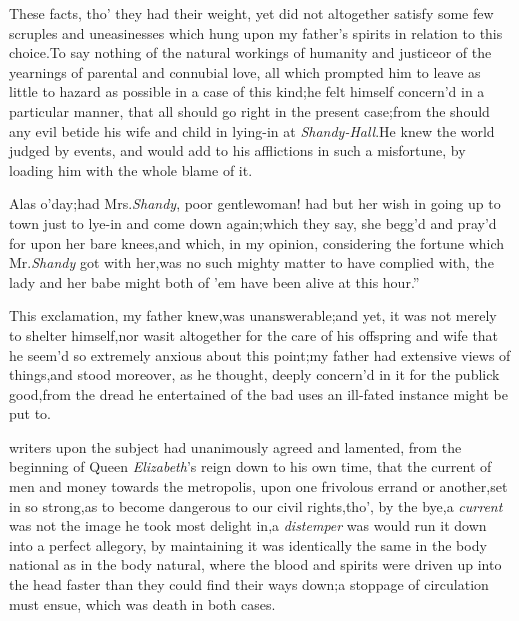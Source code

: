 \documentclass{article}
\begin{document}
These facts, tho’ they had their weight, yet did not
altogether satisfy some few scruples and uneasinesses which hung
upon my father’s spirits in relation to this choice.\tsk  To
say nothing of the natural workings of humanity and
justice\tsk  or of the yearnings of parental and connubial love,
all which prompted him to leave as little to hazard as possible in a case of this
kind;\tsh  he felt himself concern’d in a particular
manner, that all should go right in the present case;\tsk  from
the\pb 
{}
should any evil betide his
wife and child in lying-in at \textit{Shandy-Hall}.\tsh  He
knew the world judged by events, and would add to his afflictions
in such a misfortune, by loading him with the whole blame of
it.\tsh 
\begin{story}{Alas o’day;\tsk had Mrs.\@ \textit{Shandy},}
    poor gentlewoman! had but her wish in going up to
town just to lye-in and come down again;\tsk  which they say, she
begg’d and pray’d for upon her bare knees,\tsh  and which,
in my opinion, considering the fortune which Mr.\@ \textit{Shandy} got
with her,\tsk  was no such mighty matter to have complied with,
the lady and her babe might both of ’em have been alive at this
hour.”
\end{story}

\vspace\parskip
This exclamation, my father knew,\break was unanswerable;\tsk  and
yet, it was not merely to shelter himself,\tsk  nor was\pb it
altogether for the care of his offspring and wife that he seem’d so
extremely anxious about this point;\tsk  my father had extensive
views of things,\tsh  and stood moreover, as he thought,
deeply concern’d in it for the publick good,\break from the dread he
entertained of the bad uses an ill-fated instance might be put
to.

\noindent
{}
writers upon the subject
had unanimous\-ly agreed and lamented, from the beginning of Queen
\textit{Elizabeth}’s reign down to his own time, that the
current of men and money towards the metropolis, upon one frivolous
errand or another,\tsh set in so strong,\tsh  as to become
dangerous to our civil rights,\tsk  tho’, by the
bye,\tsh  a \textit{current} was not the image he took most
delight in,\tsk  a \textit{distemper} was\pb
{}
would run it down into a perfect allegory, by
maintaining it was identically the same in the body national as in
the body natural, where the blood and spirits were driven up into
the head faster than they could find their ways
down;\tsh  a stoppage of circulation must ensue, which was
death in both cases.
\end{document}
